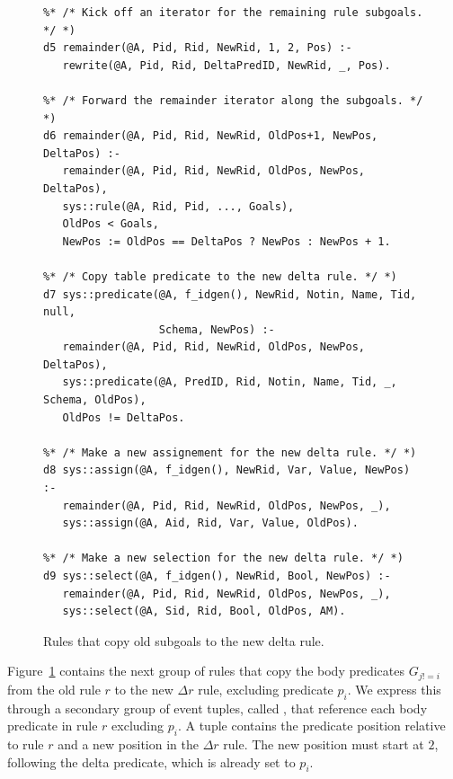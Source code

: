 \begin{figure}[!t]
\ssp
\centering
\begin{lstlisting}
%* /* Kick off an iterator for the remaining rule subgoals. */ *)
d5 remainder(@A, Pid, Rid, NewRid, 1, 2, Pos) :-
   rewrite(@A, Pid, Rid, DeltaPredID, NewRid, _, Pos).

%* /* Forward the remainder iterator along the subgoals. */ *)
d6 remainder(@A, Pid, Rid, NewRid, OldPos+1, NewPos, DeltaPos) :-
   remainder(@A, Pid, Rid, NewRid, OldPos, NewPos, DeltaPos),
   sys::rule(@A, Rid, Pid, ..., Goals),
   OldPos < Goals,
   NewPos := OldPos == DeltaPos ? NewPos : NewPos + 1.

%* /* Copy table predicate to the new delta rule. */ *)
d7 sys::predicate(@A, f_idgen(), NewRid, Notin, Name, Tid, null, 
                  Schema, NewPos) :-
   remainder(@A, Pid, Rid, NewRid, OldPos, NewPos, DeltaPos),
   sys::predicate(@A, PredID, Rid, Notin, Name, Tid, _, Schema, OldPos),
   OldPos != DeltaPos.

%* /* Make a new assignement for the new delta rule. */ *)
d8 sys::assign(@A, f_idgen(), NewRid, Var, Value, NewPos) :-
   remainder(@A, Pid, Rid, NewRid, OldPos, NewPos, _),
   sys::assign(@A, Aid, Rid, Var, Value, OldPos).

%* /* Make a new selection for the new delta rule. */ *)
d9 sys::select(@A, f_idgen(), NewRid, Bool, NewPos) :-
   remainder(@A, Pid, Rid, NewRid, OldPos, NewPos, _),
   sys::select(@A, Sid, Rid, Bool, OldPos, AM).

\end{lstlisting}
\caption{\label{ch:evita:fig:delta3}Rules that copy old subgoals to the new 
delta rule.}
\end{figure}

Figure~\ref{ch:evita:fig:delta3} contains the next group of rules that copy the
body predicates $G_{j!=i}$ from the old rule $r$ to the new $\Delta r$ rule,
excluding predicate $p_i$.  We express this through a secondary group of event
tuples, called , that reference each body predicate in rule $r$
excluding $p_i$.  A  tuple contains the predicate position
relative to rule $r$ and a new position in the $\Delta r$ rule.  The new
position must start at $2$, following the delta predicate, which is already set
to $p_i$.

